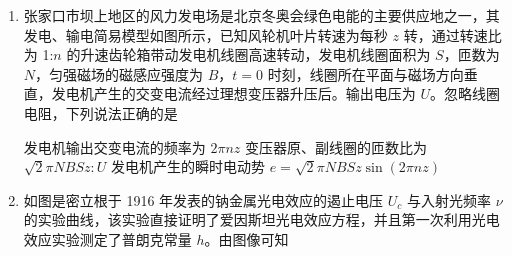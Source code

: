 \documentclass[\gkver]{gaokaozhenti}
\begin{document}
\begin{enumerate}
{$G\frac{Mm}{r^{2}}=m\frac{v^{2}}{r}$

解得公转的线速度大小为

$v=\sqrt{\frac{GM}{r}}$

其中中心天体的质量之比为 2:1，公转的轨道半径相等，则望舒与地球公转速度大小的比值为 $\sqrt{2}$，故选 C。
}

\item
张家口市坝上地区的风力发电场是北京冬奥会绿色电能的主要供应地之一，其发电、输电简易模型如图所示，已知风轮机叶片转速为每秒 $z$ 转，通过转速比为 1:$n$ 的升速齿轮箱带动发电机线圈高速转动，发电机线圈面积为 $S$，匝数为 $N$，匀强磁场的磁感应强度为 $B$，$t=0$ 时刻，线圈所在平面与磁场方向垂直，发电机产生的交变电流经过理想变压器升压后。输出电压为 $U$。忽略线圈电阻，下列说法正确的是


{发电机输出交变电流的频率为 $2\pi nz$}
{变压器原、副线圈的匝数比为 $\sqrt{2}\pi NBSz:U$}
{发电机产生的瞬时电动势 $e=\sqrt{2}\pi NBSz\sin(2\pi nz)$}


\item
如图是密立根于 1916 年发表的钠金属光电效应的遏止电压 $U_{c}$ 与入射光频率 $\nu$ 的实验曲线，该实验直接证明了爱因斯坦光电效应方程，并且第一次利用光电效应实验测定了普朗克常量 $h$。由图像可知

\onepicture[w=9.50cm]{}


\end{enumerate}
\end{document}
